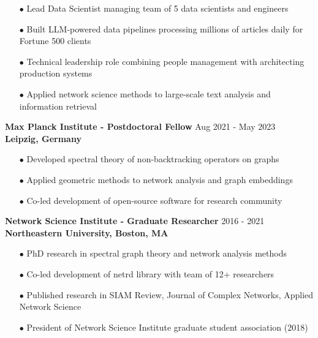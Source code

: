 \documentclass[11pt,a4paper]{article}
\newlength{\spacexs}    \setlength{\spacexs}{6pt}      %
\newlength{\spacemd}    \setlength{\spacemd}{19pt}     %
\newcommand{\bodytext}[1]{%
    {\fontsize{10pt}{14pt}\selectfont\color{charcoal} #1}%
}
\newcommand{\microtext}[1]{%
    {\fontsize{8pt}{11pt}\selectfont\color{mediumgray} #1}%
}
\newcommand{\goldbullet}{{\color{gold}$\bullet$}\space}
\newcommand{\jobduration}[1]{%
    {\fontspec{JetBrains Mono}\microtext{#1}}
}
\newcommand{\companyname}[1]{%
    {\color{darkgray}\bfseries #1}
}
\begin{document}
\vspace{\spacexs}
\begin{itemize}[leftmargin=15pt,itemindent=0pt,labelwidth=10pt,labelsep=5pt,itemsep=2pt,parsep=0pt,topsep=0pt,partopsep=0pt]
    \item[\goldbullet] \bodytext{Lead Data Scientist managing team of 5 data scientists and engineers}
    \item[\goldbullet] \bodytext{Built LLM-powered data pipelines processing millions of articles daily for Fortune 500 clients}
    \item[\goldbullet] \bodytext{Technical leadership role combining people management with architecting production systems}
    \item[\goldbullet] \bodytext{Applied network science methods to large-scale text analysis and information retrieval}
\end{itemize}

\vspace{\spacemd}

\bodytext{\textbf{Max Planck Institute - Postdoctoral Fellow}} \hfill \jobduration{Aug 2021 - May 2023}\\
\companyname{Leipzig, Germany}

\vspace{\spacexs}
\begin{itemize}[leftmargin=15pt,itemindent=0pt,labelwidth=10pt,labelsep=5pt,itemsep=1pt,parsep=0pt,topsep=0pt,partopsep=0pt]
    \item[\goldbullet] \bodytext{Developed spectral theory of non-backtracking operators on graphs}
    \item[\goldbullet] \bodytext{Applied geometric methods to network analysis and graph embeddings}
    \item[\goldbullet] \bodytext{Co-led development of open-source software for research community}
\end{itemize}

\vspace{\spacemd}

\bodytext{\textbf{Network Science Institute - Graduate Researcher}} \hfill \jobduration{2016 - 2021}\\
\companyname{Northeastern University, Boston, MA}

\vspace{\spacexs}
\begin{itemize}[leftmargin=15pt,itemindent=0pt,labelwidth=10pt,labelsep=5pt,itemsep=1pt,parsep=0pt,topsep=0pt,partopsep=0pt]
    \item[\goldbullet] \bodytext{PhD research in spectral graph theory and network analysis methods}
    \item[\goldbullet] \bodytext{Co-led development of netrd library with team of 12+ researchers}
    \item[\goldbullet] \bodytext{Published research in SIAM Review, Journal of Complex Networks, Applied Network Science}
    \item[\goldbullet] \bodytext{President of Network Science Institute graduate student association (2018)}
\end{itemize}
\end{document}
